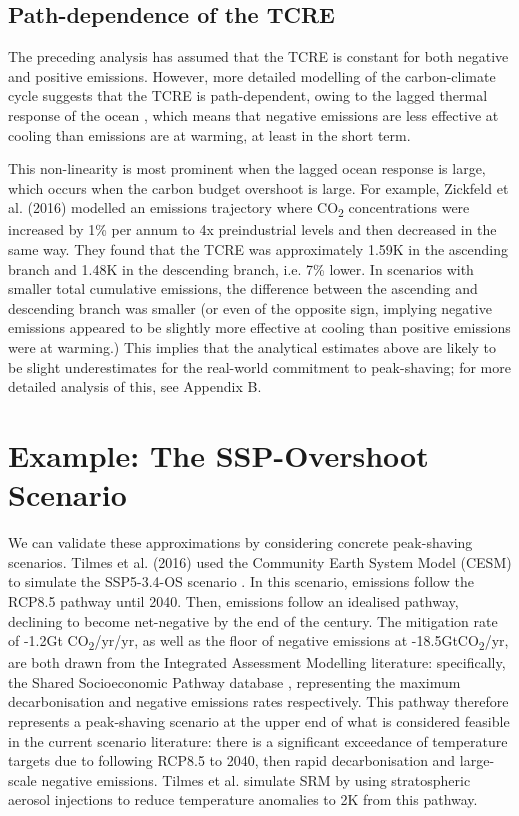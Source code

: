 \documentclass[draft]{agujournal2019}
\begin{document}
\subsection{Path-dependence of the TCRE} 

The preceding analysis has assumed that the TCRE is constant for both negative and positive emissions. However, more detailed modelling of the carbon-climate cycle suggests that the TCRE is path-dependent, owing to the lagged thermal response of the ocean \cite{zickfeld2016proportionality}, which means that negative emissions are less effective at cooling than emissions are at warming, at least in the short term. 

\medskip

This non-linearity is most prominent when the lagged ocean response is large, which occurs when the carbon budget overshoot is large. For example, Zickfeld et al. (2016) modelled an emissions trajectory where CO\textsubscript{2} concentrations were increased by 1\% per annum to 4x preindustrial levels and then decreased in the same way. They found that the TCRE was approximately 1.59K in the ascending branch and 1.48K in the descending branch, i.e. 7\% lower.  In scenarios with smaller total cumulative emissions, the difference between the ascending and descending branch was smaller (or even of the opposite sign, implying negative emissions appeared to be slightly more effective at cooling than positive emissions were at warming.) This implies that the analytical estimates above are likely to be slight underestimates for the real-world commitment to peak-shaving; for more detailed analysis of this, see Appendix B. 
 


\section{Example: The SSP-Overshoot Scenario}

We can validate these approximations by considering concrete peak-shaving scenarios. Tilmes et al. (2016) \cite{tilmes2016climate} used the Community Earth System Model (CESM) to simulate the SSP5-3.4-OS scenario \cite{gmd-2019-222}. In this scenario, emissions follow the RCP8.5 pathway until 2040. Then, emissions follow an idealised pathway, declining to become net-negative by the end of the century. The mitigation rate of -1.2Gt CO\textsubscript{2}/yr/yr, as well as the floor of negative emissions at -18.5GtCO\textsubscript{2}/yr, are both drawn from the Integrated Assessment Modelling literature: specifically, the Shared Socioeconomic Pathway database \cite{Riahi2017}, representing the maximum decarbonisation and negative emissions rates respectively. This pathway therefore represents a peak-shaving scenario at the upper end of what is considered feasible in the current scenario literature: there is a significant exceedance of temperature targets due to following RCP8.5 to 2040, then rapid decarbonisation and large-scale negative emissions. Tilmes et al. simulate SRM by using stratospheric aerosol injections to reduce temperature anomalies to 2K from this pathway. 
\end{document}

